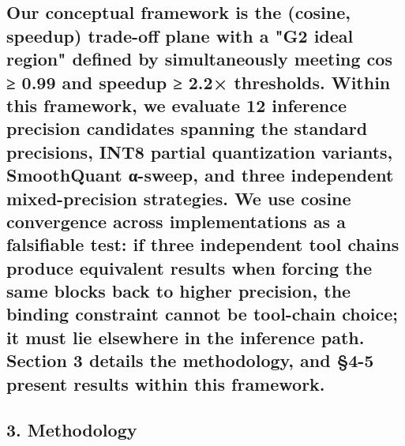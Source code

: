 \documentclass[
]{article}
\begin{document}
\subsection{\texorpdfstring{Our \textbf{conceptual framework} is the
(cosine, speedup) trade-off plane with a "G2 ideal region" defined by
simultaneously meeting cos ≥ 0.99 and speedup ≥ 2.2× thresholds. Within
this framework, we evaluate 12 inference precision candidates spanning
the standard precisions, INT8 partial quantization variants, SmoothQuant
α-sweep, and three independent mixed-precision strategies. We use cosine
convergence across implementations as a falsifiable test: if three
independent tool chains produce equivalent results when forcing the same
blocks back to higher precision, the binding constraint cannot be
tool-chain choice; it must lie elsewhere in the inference path. Section
3 details the methodology, and §4-5 present results within this
framework.}{Our conceptual framework is the (cosine, speedup) trade-off plane with a "G2 ideal region" defined by simultaneously meeting cos ≥ 0.99 and speedup ≥ 2.2× thresholds. Within this framework, we evaluate 12 inference precision candidates spanning the standard precisions, INT8 partial quantization variants, SmoothQuant α-sweep, and three independent mixed-precision strategies. We use cosine convergence across implementations as a falsifiable test: if three independent tool chains produce equivalent results when forcing the same blocks back to higher precision, the binding constraint cannot be tool-chain choice; it must lie elsewhere in the inference path. Section 3 details the methodology, and §4-5 present results within this framework.}}\label{our-conceptual-framework-is-the-cosine-speedup-trade-off-plane-with-a-g2-ideal-region-defined-by-simultaneously-meeting-cos--099-and-speedup--22-thresholds-within-this-framework-we-evaluate-12-inference-precision-candidates-spanning-the-standard-precisions-int8-partial-quantization-variants-smoothquant-ux3b1-sweep-and-three-independent-mixed-precision-strategies-we-use-cosine-convergence-across-implementations-as-a-falsifiable-test-if-three-independent-tool-chains-produce-equivalent-results-when-forcing-the-same-blocks-back-to-higher-precision-the-binding-constraint-cannot-be-tool-chain-choice-it-must-lie-elsewhere-in-the-inference-path-section-3-details-the-methodology-and-4-5-present-results-within-this-framework}

\subsection{3. Methodology}\label{3-methodology}
\end{document}

